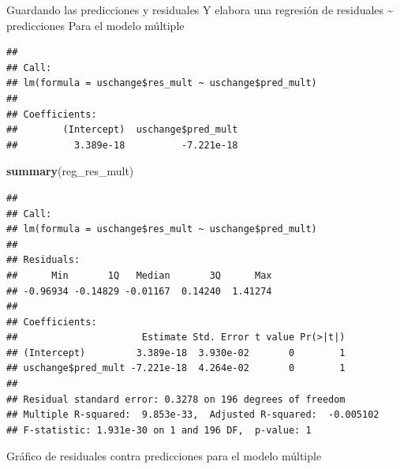 \documentclass[
]{article}
\newenvironment{Shaded}{\begin{snugshade}}{\end{snugshade}}
\newcommand{\CommentTok}[1]{\textcolor[rgb]{0.56,0.35,0.01}{\textit{#1}}}
\newcommand{\FunctionTok}[1]{\textcolor[rgb]{0.13,0.29,0.53}{\textbf{#1}}}
\newcommand{\NormalTok}[1]{#1}
\newcommand{\OtherTok}[1]{\textcolor[rgb]{0.56,0.35,0.01}{#1}}
\newcommand{\SpecialCharTok}[1]{\textcolor[rgb]{0.81,0.36,0.00}{\textbf{#1}}}
\begin{document}
Guardando las predicciones y residuales Y elabora una regresión de
residuales \textasciitilde{} predicciones Para el modelo múltiple

\begin{Shaded}
\end{Shaded}

\begin{verbatim}
## 
## Call:
## lm(formula = uschange$res_mult ~ uschange$pred_mult)
## 
## Coefficients:
##        (Intercept)  uschange$pred_mult  
##          3.389e-18          -7.221e-18
\end{verbatim}

\begin{Shaded}
\begin{Highlighting}[]
\FunctionTok{summary}\NormalTok{(reg\_res\_mult)}
\end{Highlighting}
\end{Shaded}

\begin{verbatim}
## 
## Call:
## lm(formula = uschange$res_mult ~ uschange$pred_mult)
## 
## Residuals:
##      Min       1Q   Median       3Q      Max 
## -0.96934 -0.14829 -0.01167  0.14240  1.41274 
## 
## Coefficients:
##                      Estimate Std. Error t value Pr(>|t|)
## (Intercept)         3.389e-18  3.930e-02       0        1
## uschange$pred_mult -7.221e-18  4.264e-02       0        1
## 
## Residual standard error: 0.3278 on 196 degrees of freedom
## Multiple R-squared:  9.853e-33,  Adjusted R-squared:  -0.005102 
## F-statistic: 1.931e-30 on 1 and 196 DF,  p-value: 1
\end{verbatim}

Gráfico de residuales contra predicciones para el modelo múltiple
\end{document}
